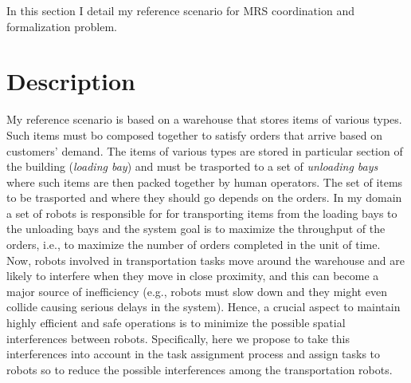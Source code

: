 In this section I detail my reference scenario for MRS coordination and formalization problem.

\section{Description}
My reference scenario is based on a warehouse that stores items of various types.
Such items must bo composed together to satisfy orders that arrive based on customers’ demand.
The items of various types are stored in particular section of the building (\textit{loading bay})
and must be trasported to a set of \textit{unloading bays} where such items are then 
packed together by human operators. The set of items to be trasported and where they should
go depends on the orders.
In my domain a set of robots is responsible for for transporting items from
the loading bays to the unloading bays and the system goal is to maximize the
throughput of the orders, i.e., to maximize the number of orders completed in
the unit of time. Now, robots involved in transportation tasks move around
the warehouse and are likely to interfere when they move in close proximity,
and this can become a major source of inefficiency (e.g., robots must slow down
and they might even collide causing serious delays in the system).
Hence, a crucial aspect to maintain highly efficient and safe operations is to minimize the
possible spatial interferences between robots. Specifically, here we propose to
take this interferences into account in the task assignment process and assign
tasks to robots so to reduce the possible interferences among the transportation
robots.



